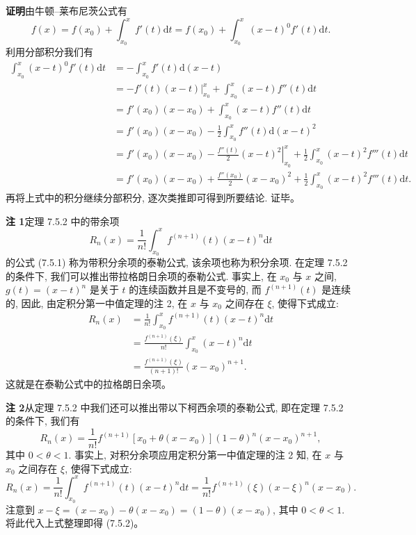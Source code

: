 \documentclass[UTF8, 12pt, fontset=fandol, oneside]{ctexart}
\begin{document}
\noindent\textbf{证明}\quad 由牛顿--莱布尼茨公式有
\[
  f(x)=f(x_0)+\int_{x_0}^x f'(t)\mathrm dt
  =f(x_0)+\int_{x_0}^x (x-t)^0f'(t)\mathrm dt.
\]
利用分部积分我们有
\[
\begin{aligned}
  \int_{x_0}^x (x-t)^0f'(t)\mathrm dt
  &=-\int_{x_0}^x f'(t)\mathrm d(x-t)\\
  &=-\left.f'(t)(x-t)\right|_{x_0}^x+\int_{x_0}^x (x-t)f''(t)\mathrm dt\\
  &=f'(x_0)(x-x_0)+\int_{x_0}^x (x-t)f''(t)\mathrm dt\\
  &=f'(x_0)(x-x_0)-\frac{1}{2}\int_{x_0}^x f''(t)\mathrm d(x-t)^2\\
  &=f'(x_0)(x-x_0)-\left.\frac{f''(t)}{2}(x-t)^2\right|_{x_0}^x
  +\frac{1}{2}\int_{x_0}^x (x-t)^2f'''(t)\mathrm dt\\
  &=f'(x_0)(x-x_0)+\frac{f''(x_0)}{2}(x-x_0)^2
  +\frac{1}{2}\int_{x_0}^x (x-t)^2f'''(t)\mathrm dt.
\end{aligned}
\]
再将上式中的积分继续分部积分, 逐次类推即可得到所要结论. 证毕。

\noindent\textbf{注 1}\quad 定理 7.5.2 中的带余项
\[
  R_n(x)=\frac{1}{n!}\int_{x_0}^x f^{(n+1)}(t)(x-t)^n\mathrm dt
\]
的公式 (7.5.1) 称为带积分余项的泰勒公式, 该余项也称为积分余项. 在定理 7.5.2 的条件下, 我们可以推出带拉格朗日余项的泰勒公式. 事实上, 在 $x_0$ 与 $x$ 之间, $g(t)=(x-t)^n$ 是关于 $t$ 的连续函数并且是不变号的, 而 $f^{(n+1)}(t)$ 是连续的, 因此, 由定积分第一中值定理的注 2, 在 $x$ 与 $x_0$ 之间存在 $\xi$, 使得下式成立:
\[
\begin{aligned}
  R_n(x)&=\frac{1}{n!}\int_{x_0}^x f^{(n+1)}(t)(x-t)^n\mathrm dt\\
  &=\frac{f^{(n+1)}(\xi)}{n!}\int_{x_0}^x (x-t)^n\mathrm dt\\
  &=\frac{f^{(n+1)}(\xi)}{(n+1)!}(x-x_0)^{n+1}.
\end{aligned}
\]
这就是在泰勒公式中的拉格朗日余项。

\noindent\textbf{注 2}\quad 从定理 7.5.2 中我们还可以推出带以下柯西余项的泰勒公式, 即在定理 7.5.2 的条件下, 我们有
\begin{equation}
  R_n(x)=\frac{1}{n!}f^{(n+1)}[x_0+\theta(x-x_0)](1-\theta)^n(x-x_0)^{n+1},
  \tag{7.5.2}
\end{equation}
其中 $0<\theta<1$. 事实上, 对积分余项应用定积分第一中值定理的注 2 知, 在 $x$ 与 $x_0$ 之间存在 $\xi$, 使得下式成立:
\[
  R_n(x)=\frac{1}{n!}\int_{x_0}^x f^{(n+1)}(t)(x-t)^n\mathrm dt
  =\frac{1}{n!}f^{(n+1)}(\xi)(x-\xi)^n(x-x_0).
\]
注意到 $x-\xi=(x-x_0)-\theta(x-x_0)=(1-\theta)(x-x_0)$, 其中 $0<\theta<1$. 将此代入上式整理即得 (7.5.2)。
\end{document}
